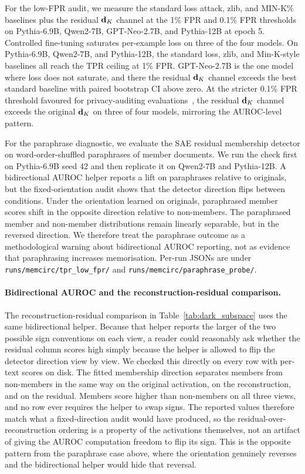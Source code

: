 For the low-FPR audit, we measure the standard loss attack, zlib, and MIN-K\% baselines plus the residual $\mathbf{d}_K$ channel at the 1\% FPR and 0.1\% FPR thresholds on Pythia-6.9B, Qwen2-7B, GPT-Neo-2.7B, and Pythia-12B at epoch 5. Controlled fine-tuning saturates per-example loss on three of the four models. On Pythia-6.9B, Qwen2-7B, and Pythia-12B, the standard loss, zlib, and Min-K-style baselines all reach the TPR ceiling at 1\% FPR. GPT-Neo-2.7B is the one model where loss does not saturate, and there the residual $\mathbf{d}_K$ channel exceeds the best standard baseline with paired bootstrap CI above zero. At the stricter 0.1\% FPR threshold favoured for privacy-auditing evaluations~\citep{chen2026wbc, ilic2026ezmia}, the residual $\mathbf{d}_K$ channel exceeds the original $\mathbf{d}_K$ on three of four models, mirroring the AUROC-level pattern.

For the paraphrase diagnostic, we evaluate the SAE residual membership detector on word-order-shuffled paraphrases of member documents. We run the check first on Pythia-6.9B seed 42 and then replicate it on Qwen2-7B and Pythia-12B. A bidirectional AUROC helper reports a lift on paraphrases relative to originals, but the fixed-orientation audit shows that the detector direction flips between conditions. Under the orientation learned on originals, paraphrased member scores shift in the opposite direction relative to non-members. The paraphrased member and non-member distributions remain linearly separable, but in the reversed direction. We therefore treat the paraphrase outcome as a methodological warning about bidirectional AUROC reporting, not as evidence that paraphrasing increases memorisation. Per-run JSONs are under \texttt{runs/\allowbreak{}memcirc/\allowbreak{}tpr\_\allowbreak{}low\_\allowbreak{}fpr/\allowbreak{}} and \texttt{runs/\allowbreak{}memcirc/\allowbreak{}paraphrase\_\allowbreak{}probe/\allowbreak{}}.

\paragraph{Bidirectional AUROC and the reconstruction-residual comparison.}
The reconstruction-residual comparison in Table~\ref{tab:dark_subspace} uses the same bidirectional helper. Because that helper reports the larger of the two possible sign conventions on each view, a reader could reasonably ask whether the residual column scores high simply because the helper is allowed to flip the detector direction view by view. We checked this directly on every row with per-text scores on disk. The fitted membership direction separates members from non-members in the same way on the original activation, on the reconstruction, and on the residual. Members score higher than non-members on all three views, and no row ever requires the helper to swap signs. The reported values therefore match what a fixed-direction audit would have produced, so the residual-over-reconstruction ordering is a property of the activations themselves, not an artifact of giving the AUROC computation freedom to flip its sign. This is the opposite pattern from the paraphrase case above, where the orientation genuinely reverses and the bidirectional helper would hide that reversal.

